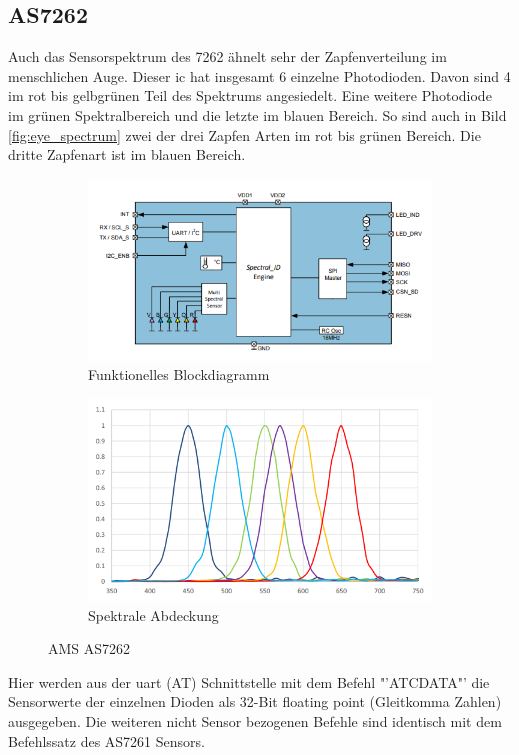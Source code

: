 \documentclass[11pt]{scrartcl}
\begin{document}
\subsection{AS7262}
Auch das Sensorspektrum des 7262 ähnelt sehr der Zapfenverteilung im menschlichen Auge. Dieser \ac{ic} hat insgesamt 6 einzelne Photodioden.
Davon sind 4 im rot bis gelbgrünen Teil des Spektrums angesiedelt. Eine weitere Photodiode im grünen Spektralbereich und die letzte im blauen
Bereich. So sind auch in Bild \ref{fig:eye_spectrum} zwei der drei Zapfen Arten im rot bis grünen Bereich. Die dritte Zapfenart ist im blauen
Bereich.
\begin{figure}[H]
    \centering
    \begin{subfigure}[b]{0.49\textwidth}
        \includegraphics[width=\textwidth]{images/AS7262_functional_blockdiagram.png}
        \caption{Funktionelles Blockdiagramm}
    \end{subfigure}
    \hfill 
    \begin{subfigure}[b]{0.49\textwidth}
        \includegraphics[width=\textwidth]{images/AS7262_spectrum.png}
        \caption{Spektrale Abdeckung}\label{fig:spec_7262}
    \end{subfigure}
    \caption{AMS AS7262 \cite{datasheet62}}\label{fig:AS7262}
\end{figure}
\noindent
Hier werden aus der \ac{uart} (AT) Schnittstelle mit dem Befehl "'ATCDATA"' die Sensorwerte der einzelnen Dioden als 32-Bit floating point
(Gleitkomma Zahlen) ausgegeben. Die weiteren nicht Sensor bezogenen Befehle sind identisch mit dem Befehlssatz des AS7261 Sensors.
\clearpage
\end{document}
